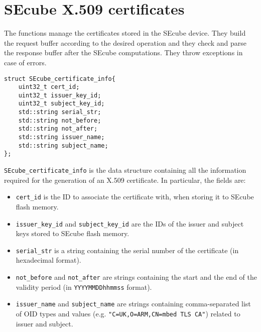 \section{SEcube X.509 certificates}
The functions manage the certificates stored in the SEcube device. They build
the request buffer according to the desired operation and they check and parse
the response buffer after the SEcube computations. They throw exceptions in
case of errors.

\begin{lstlisting}
struct SEcube_certificate_info{
	uint32_t cert_id;
	uint32_t issuer_key_id;
	uint32_t subject_key_id;
	std::string serial_str;
	std::string not_before;
	std::string not_after;
	std::string issuer_name;
	std::string subject_name;
};
\end{lstlisting}

\texttt{SEcube\_certificate\_info} is the data structure containing all the
information required for the generation of an X.509 certificate.
In particular, the fields are:
\begin{itemize}
	\item \texttt{cert\_id} is the ID to associate the certificate with,
		when storing it to SEcube flash memory.
	\item \texttt{issuer\_key\_id} and \texttt{subject\_key\_id}
		are the IDs of the issuer and subject keys stored to SEcube
		flash memory.
	\item \texttt{serial\_str} is a string containing the serial number of
		the certificate (in hexadecimal format).
	\item \texttt{not\_before} and \texttt{not\_after} are strings
		containing the start and the end of the validity period
		(in \texttt{YYYYMMDDhhmmss} format).
	\item \texttt{issuer\_name} and \texttt{subject\_name} are strings
		containing comma-separated list of OID types and values
		(e.g. \texttt{"C=UK,O=ARM,CN=mbed TLS CA"}) related to issuer
		and subject.
\end{itemize}

